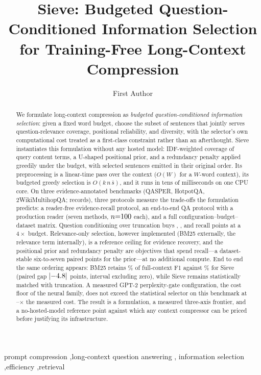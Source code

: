 \documentclass[preprint,12pt]{elsarticle}
\author{First Author\corref{cor1}}
\DeclarePairedDelimiter\abs{\lvert}{\rvert}
\theoremstyle{remark}
\newcommand{\method}{Sieve}
\begin{document}
\begin{frontmatter}

\title{Sieve: Budgeted Question-Conditioned Information
Selection for Training-Free Long-Context Compression}

\begin{abstract}
We formulate long-context compression as \emph{budgeted
question-conditioned information selection}: given a fixed word budget,
choose the subset of sentences that jointly serves question-relevance
coverage, positional reliability, and diversity, with the selector's own
computational cost treated as a first-class constraint rather than an
afterthought. \method{} instantiates this formulation without any hosted
model: IDF-weighted coverage of query content terms, a U-shaped
positional prior, and a redundancy penalty applied greedily under the
budget, with selected sentences emitted in their original order. Its
preprocessing is a linear-time pass over the context ($O(W)$ for a
$W$-word context), its budgeted greedy selection is
$O(k\,n\,\bar{s})$, and it runs in tens of milliseconds on one CPU core.
On three evidence-annotated benchmarks (QASPER, HotpotQA,
2WikiMultihopQA; \TotalRecords{} records), three protocols measure the
trade-offs the formulation predicts: a reader-free evidence-recall
protocol, an end-to-end QA protocol with a production reader (seven
methods, $n{=}100$ each), and a full configuration--budget--dataset
matrix. Question conditioning over truncation buys \PairQSH{}, \PairHSH{},
and \PairWSH{} recall points at a $4\times$ budget. Relevance-only
selection, however implemented (BM25 externally, the relevance term
internally), is a reference ceiling for evidence recovery, and the
positional prior and redundancy penalty are objectives that spend
recall---a dataset-stable six-to-seven paired points for the prior---at
no additional compute. End to end the same ordering appears: BM25
retains \QABmRetain\% of full-context F1 against \QASieRetain\% for
\method{} (paired gap $\abs{\QAPairSBm}$ points, interval excluding
zero), while \method{} remains statistically matched with truncation.
A measured GPT-2 perplexity-gate configuration, the cost floor of the
neural family, does not exceed the statistical selector on this
benchmark at \GateSieRatioMed--\GateSieRatioSixk$\times$ the measured
cost. The result is a formulation, a measured three-axis frontier, and a
no-hosted-model reference point against which any context compressor can
be priced before justifying its infrastructure.
\end{abstract}

\begin{keyword}
prompt compression \sep long-context question answering \sep
information selection \sep efficiency \sep retrieval
\end{keyword}

\end{frontmatter}
\end{document}
